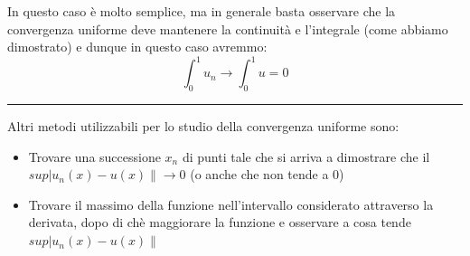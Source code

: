 \documentclass{article}
\theoremstyle{definition}
\newcommand{\linea}{\vspace{15pt}\hrule\vspace{15pt}}
\begin{document}
In questo caso è molto semplice, ma in generale basta osservare che la convergenza uniforme deve mantenere la continuità e l'integrale (come abbiamo dimostrato) e dunque in questo caso avremmo:
\begin{equation}
    \int_0^1 u_n \to \int_0^1 u=0
\end{equation}
\linea
Altri metodi utilizzabili per lo studio della convergenza uniforme sono:
\begin{itemize}
    \item Trovare una successione $x_n$ di punti tale che si arriva a dimostrare che il $sup\left|u_n(x)-u(x)\right\| \to 0$ (o anche che non tende a 0)
    \item Trovare il massimo della funzione nell'intervallo considerato attraverso la derivata, dopo di chè maggiorare la funzione e osservare a cosa tende $sup\left|u_n(x)-u(x)\right\|$
\end{itemize}


\end{document}
